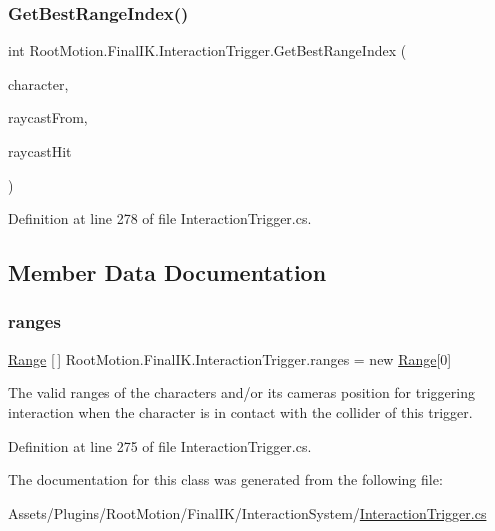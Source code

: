 \subsubsection{\texorpdfstring{Get\+Best\+Range\+Index()}{GetBestRangeIndex()}}
{\footnotesize\ttfamily int Root\+Motion.\+Final\+I\+K.\+Interaction\+Trigger.\+Get\+Best\+Range\+Index (\begin{DoxyParamCaption}\item[{Transform}]{character,  }\item[{Transform}]{raycast\+From,  }\item[{Raycast\+Hit}]{raycast\+Hit }\end{DoxyParamCaption})}



Definition at line 278 of file Interaction\+Trigger.\+cs.



\subsection{Member Data Documentation}
\mbox{\label{class_root_motion_1_1_final_i_k_1_1_interaction_trigger_a13948fdb3d84a0bea1e15d1eb2ce019e}} 
\subsubsection{\texorpdfstring{ranges}{ranges}}
{\footnotesize\ttfamily \mbox{\hyperlink{class_root_motion_1_1_final_i_k_1_1_interaction_trigger_1_1_range}{Range}} \mbox{[}$\,$\mbox{]} Root\+Motion.\+Final\+I\+K.\+Interaction\+Trigger.\+ranges = new \mbox{\hyperlink{class_root_motion_1_1_final_i_k_1_1_interaction_trigger_1_1_range}{Range}}\mbox{[}0\mbox{]}}



The valid ranges of the character\textquotesingle{}s and/or it\textquotesingle{}s camera\textquotesingle{}s position for triggering interaction when the character is in contact with the collider of this trigger. 



Definition at line 275 of file Interaction\+Trigger.\+cs.



The documentation for this class was generated from the following file\+:\begin{DoxyCompactItemize}
\item 
Assets/\+Plugins/\+Root\+Motion/\+Final\+I\+K/\+Interaction\+System/\mbox{\hyperlink{_interaction_trigger_8cs}{Interaction\+Trigger.\+cs}}\end{DoxyCompactItemize}
